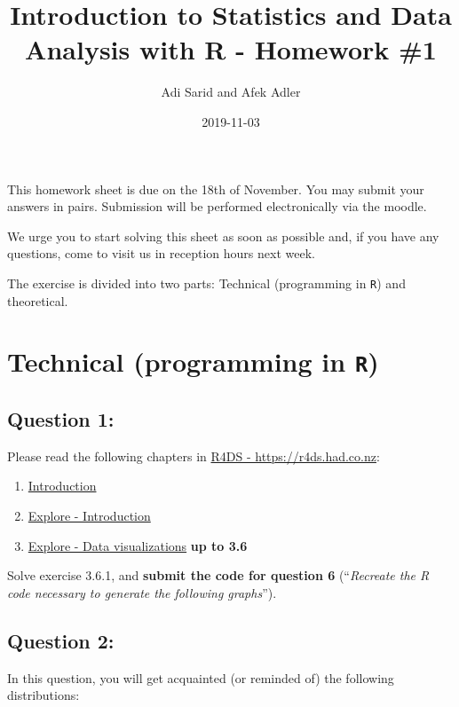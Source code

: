 \documentclass[
]{article}
\title{Introduction to Statistics and Data Analysis with R - Homework \#1}
\author{Adi Sarid and Afek Adler}
\date{2019-11-03}
\providecommand{\tightlist}{%
  \setlength{\itemsep}{0pt}\setlength{\parskip}{0pt}}
\begin{document}
\maketitle

This homework sheet is due on the 18th of November. You may submit your
answers in pairs. Submission will be performed electronically via the
moodle.

We urge you to start solving this sheet as soon as possible and, if you
have any questions, come to visit us in reception hours next week.

The exercise is divided into two parts: Technical (programming in
\texttt{R}) and theoretical.

\hypertarget{technical-programming-in-r}{%
\section{\texorpdfstring{Technical (programming in
\texttt{R})}{Technical (programming in R)}}\label{technical-programming-in-r}}

\hypertarget{question-1}{%
\subsection{Question 1:}\label{question-1}}

Please read the following chapters in \href{https://r4ds.had.co.nz}{R4DS
- https://r4ds.had.co.nz}:

\begin{enumerate}
\def\labelenumi{\arabic{enumi}.}
\tightlist
\item
  \href{https://r4ds.had.co.nz/introduction.html}{Introduction}
\item
  \href{https://r4ds.had.co.nz/explore-intro.html}{Explore -
  Introduction}
\item
  \href{https://r4ds.had.co.nz/data-visualisation.html}{Explore - Data
  visualizations} \textbf{up to 3.6}
\end{enumerate}

Solve exercise 3.6.1, and \textbf{submit the code for question 6}
(``\emph{Recreate the R code necessary to generate the following
graphs}'').

\hypertarget{question-2}{%
\subsection{Question 2:}\label{question-2}}

In this question, you will get acquainted (or reminded of) the following
distributions:
\end{document}
